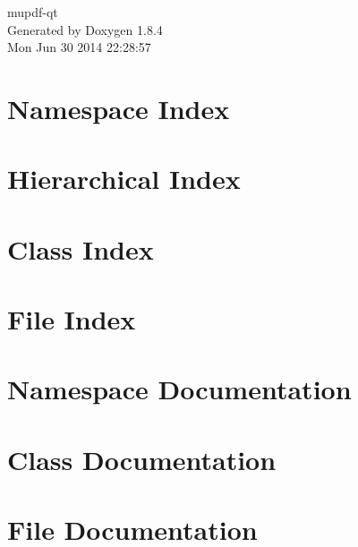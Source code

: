 \documentclass[twoside]{book}
\newcommand{\clearemptydoublepage}{%
  \newpage{\pagestyle{empty}\cleardoublepage}%
}
\begin{document}
\hypersetup{pageanchor=false}
\begin{titlepage}
\vspace*{7cm}
\begin{center}%
{\Large mupdf-\/qt }\\
\vspace*{1cm}
{\large Generated by Doxygen 1.8.4}\\
\vspace*{0.5cm}
{\small Mon Jun 30 2014 22:28:57}\\
\end{center}
\end{titlepage}
\clearemptydoublepage
\tableofcontents
\clearemptydoublepage
{}
\hypersetup{pageanchor=true}

\chapter{Namespace Index}

\chapter{Hierarchical Index}

\chapter{Class Index}

\chapter{File Index}

\chapter{Namespace Documentation}

\chapter{Class Documentation}











\chapter{File Documentation}












\newpage
{}
{}
\printindex
\end{document}

